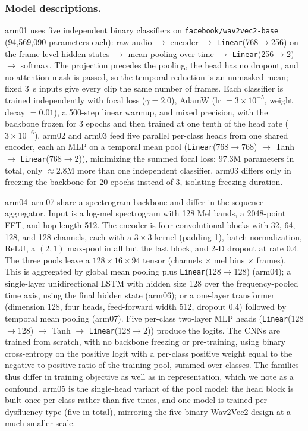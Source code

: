 \documentclass[a4paper,orivec]{llncs}
\begin{document}
\subsubsection{Model descriptions.}
arm01 uses five independent binary classifiers on
\texttt{facebook/wav2vec2-base} (94{,}569{,}090 parameters each): raw audio
$\rightarrow$ encoder $\rightarrow$ \texttt{Linear}(768$\rightarrow$256) on the
frame-level hidden states $\rightarrow$ mean pooling over time $\rightarrow$
\texttt{Linear}(256$\rightarrow$2) $\rightarrow$ softmax. The projection precedes
the pooling, the head has no dropout, and no attention mask is passed, so the
temporal reduction is an unmasked mean; fixed 3~s inputs give every clip the same
number of frames. Each classifier is trained independently with focal loss
($\gamma = 2.0$), AdamW (lr $= 3\times10^{-5}$, weight decay $= 0.01$), a 500-step
linear warmup, and mixed precision, with the backbone frozen for 3 epochs and
then trained at one tenth of the head rate ($3\times10^{-6}$). arm02 and arm03
feed five parallel per-class heads from one shared encoder, each an MLP on a
temporal mean pool (\texttt{Linear}(768$\rightarrow$768) $\rightarrow$ Tanh
$\rightarrow$ \texttt{Linear}(768$\rightarrow$2)), minimizing the summed focal
loss: 97.3M parameters in total, only ${\approx}2.8$M more than one independent
classifier. arm03 differs only in freezing the backbone for 20 epochs instead of
3, isolating freezing duration.

arm04--arm07 share a spectrogram backbone and differ in the sequence aggregator.
Input is a log-mel spectrogram with 128 Mel bands, a 2048-point FFT, and hop length
512. The encoder is four convolutional blocks with 32, 64, 128, and 128 channels,
each with a $3\times3$ kernel (padding 1), batch normalization, ReLU, a $(2,1)$
max-pool in all but the last block, and 2-D dropout at rate $0.4$. The three pools
leave a $128\times16\times94$ tensor (channels $\times$ mel bins $\times$ frames).
This is aggregated by global mean pooling plus \texttt{Linear}(128$\rightarrow$128)
(arm04); a single-layer unidirectional LSTM with hidden size 128 over the
frequency-pooled time axis, using the final hidden state (arm06); or a one-layer
transformer (dimension 128, four heads, feed-forward width 512, dropout $0.4$)
followed by temporal mean pooling (arm07). Five per-class two-layer MLP heads
(\texttt{Linear}(128$\rightarrow$128) $\rightarrow$ Tanh $\rightarrow$
\texttt{Linear}(128$\rightarrow$2)) produce the logits. The CNNs are trained from
scratch, with no backbone freezing or pre-training, using binary cross-entropy on
the positive logit with a per-class positive weight equal to the
negative-to-positive ratio of the training pool, summed over classes. The families
thus differ in training objective as well as in representation, which we note as a
confound. arm05 is the single-head variant of the pool model: the head block is
built once per class rather than five times, and one model is trained per
dysfluency type (five in total), mirroring the five-binary Wav2Vec2 design at a
much smaller scale.
\end{document}
